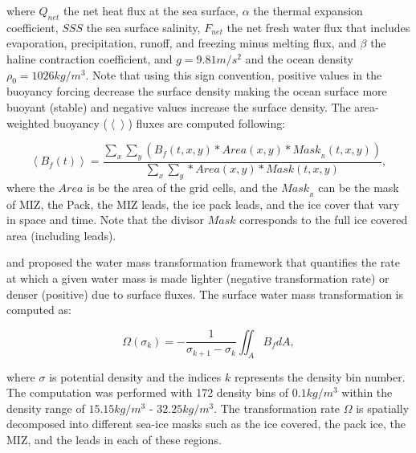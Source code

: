 \documentclass[lineno,sn-basic]{sn-jnl}%
\begin{document}
where $Q_{net}$ the net heat flux at the sea surface, $\alpha$ the thermal expansion coefficient, $SSS$ the sea surface salinity, $F_{net}$ the net fresh water flux that includes evaporation, precipitation, runoff, and freezing minus melting flux, and $\beta$ the haline contraction coefficient, and $g = 9.81 m/s^2$ and the ocean density $\rho_0 = 1026 kg/m^3$. 
Note that using this sign convention, positive values in the buoyancy forcing decrease the surface density making the ocean surface more buoyant (stable) and negative values increase the surface density. The area-weighted buoyancy ($ \left<\right>$) fluxes are computed following:

\begin{equation}
    \left<B_f (t)\right>  = \frac{\sum_x \sum_y \left( B_f(t,x,y) * Area(x,y) * Mask_{_R}(t,x,y)\right)}{\sum_x \sum_y * Area(x,y) * Mask(t,x,y)},
\end{equation}
where the $Area$ is be the area of the grid cells, and the $Mask_{_R}$ can be the mask of MIZ, the Pack, the MIZ leads, the ice pack leads, and the ice cover that vary in space and time. Note that the divisor $Mask$ corresponds to the full ice covered area (including leads).

\citet{Nurser_WMT_1999} and  \citet{Walin_WMT_1982} proposed the water mass transformation framework that quantifies the rate at which a given water mass is made lighter (negative transformation rate) or denser (positive) due to surface fluxes. The surface water mass transformation is computed as:

\begin{equation}
    \Omega(\sigma_k) = - \frac{1}{\sigma_{k+1}-\sigma_k}\iint_AB_fdA,
\end{equation}


where $\sigma$ is potential density and the indices $k$ represents the density bin number. The computation was performed with 172 density bins of $0.1 kg/m^3$ within the density range of $15.15 kg/m^3$ - $32.25 kg/m^3$. The transformation rate $\Omega$ is spatially decomposed into different sea-ice masks such as the ice covered, the pack ice, the MIZ, and the leads in each of these regions. 
\end{document}
